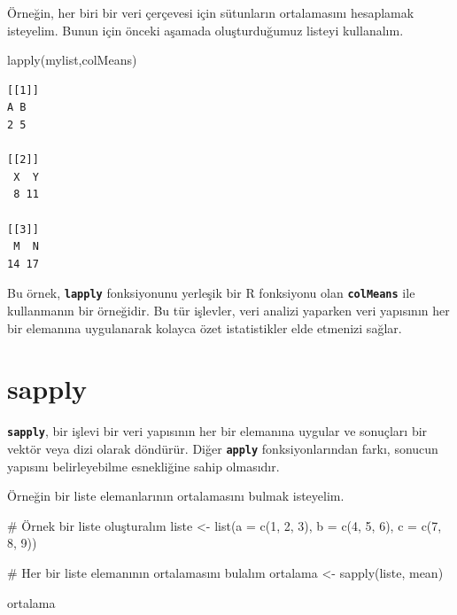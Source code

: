 \documentclass[
  letterpaper,
  DIV=11,
  numbers=noendperiod]{scrreprt}
\newenvironment{Shaded}{\begin{snugshade}}{\end{snugshade}}
\newcommand{\AttributeTok}[1]{\textcolor[rgb]{0.40,0.45,0.13}{#1}}
\newcommand{\CommentTok}[1]{\textcolor[rgb]{0.37,0.37,0.37}{#1}}
\newcommand{\DecValTok}[1]{\textcolor[rgb]{0.68,0.00,0.00}{#1}}
\newcommand{\FunctionTok}[1]{\textcolor[rgb]{0.28,0.35,0.67}{#1}}
\newcommand{\NormalTok}[1]{\textcolor[rgb]{0.00,0.23,0.31}{#1}}
\newcommand{\OtherTok}[1]{\textcolor[rgb]{0.00,0.23,0.31}{#1}}
\begin{document}
Örneğin, her biri bir veri çerçevesi için sütunların ortalamasını
hesaplamak isteyelim. Bunun için önceki aşamada oluşturduğumuz listeyi
kullanalım.

\begin{Shaded}
\begin{Highlighting}[]
\FunctionTok{lapply}\NormalTok{(mylist,colMeans)}
\end{Highlighting}
\end{Shaded}

\begin{verbatim}
[[1]]
A B 
2 5 

[[2]]
 X  Y 
 8 11 

[[3]]
 M  N 
14 17 
\end{verbatim}

Bu örnek, \textbf{\texttt{lapply}} fonksiyonunu yerleşik bir R
fonksiyonu olan \textbf{\texttt{colMeans}} ile kullanmanın bir
örneğidir. Bu tür işlevler, veri analizi yaparken veri yapısının her bir
elemanına uygulanarak kolayca özet istatistikler elde etmenizi sağlar.

\section{sapply}\label{sapply}

\textbf{\texttt{sapply}}, bir işlevi bir veri yapısının her bir
elemanına uygular ve sonuçları bir vektör veya dizi olarak döndürür.
Diğer \textbf{\texttt{apply}} fonksiyonlarından farkı, sonucun yapısını
belirleyebilme esnekliğine sahip olmasıdır.

Örneğin bir liste elemanlarının ortalamasını bulmak isteyelim.

\begin{Shaded}
\begin{Highlighting}[]
\CommentTok{\# Örnek bir liste oluşturalım}
\NormalTok{liste }\OtherTok{\textless{}{-}} \FunctionTok{list}\NormalTok{(}\AttributeTok{a =} \FunctionTok{c}\NormalTok{(}\DecValTok{1}\NormalTok{, }\DecValTok{2}\NormalTok{, }\DecValTok{3}\NormalTok{), }\AttributeTok{b =} \FunctionTok{c}\NormalTok{(}\DecValTok{4}\NormalTok{, }\DecValTok{5}\NormalTok{, }\DecValTok{6}\NormalTok{), }\AttributeTok{c =} \FunctionTok{c}\NormalTok{(}\DecValTok{7}\NormalTok{, }\DecValTok{8}\NormalTok{, }\DecValTok{9}\NormalTok{))}

\CommentTok{\# Her bir liste elemanının ortalamasını bulalım}
\NormalTok{ortalama }\OtherTok{\textless{}{-}} \FunctionTok{sapply}\NormalTok{(liste, mean)}

\NormalTok{ortalama}
\end{Highlighting}
\end{Shaded}
\end{document}
